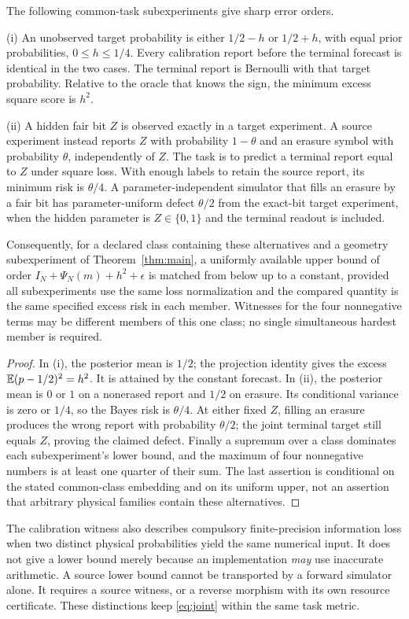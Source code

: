 \begin{proposition}\label{prop:floors}
The following common-task subexperiments give sharp error orders.

\textup{(i)} An unobserved target probability is either $1/2-h$ or $1/2+h$, with equal prior probabilities, $0\le h\le1/4$. Every calibration report before the terminal forecast is identical in the two cases. The terminal report is Bernoulli with that target probability. Relative to the oracle that knows the sign, the minimum excess square score is $h^2$.

\textup{(ii)} A hidden fair bit $Z$ is observed exactly in a target experiment. A source experiment instead reports $Z$ with probability $1-\theta$ and an erasure symbol with probability $\theta$, independently of $Z$. The task is to predict a terminal report equal to $Z$ under square loss. With enough labels to retain the source report, its minimum risk is $\theta/4$. A parameter-independent simulator that fills an erasure by a fair bit has parameter-uniform defect $\theta/2$ from the exact-bit target experiment, when the hidden parameter is $Z\in\{0,1\}$ and the terminal readout is included.

Consequently, for a declared class containing these alternatives and a geometry subexperiment of Theorem~\ref{thm:main}, a uniformly available upper bound of order $I_N+\Psi_N(m)+h^2+\epsilon$ is matched from below up to a constant, provided all subexperiments use the same loss normalization and the compared quantity is the same specified excess risk in each member. Witnesses for the four nonnegative terms may be different members of this one class; no single simultaneous hardest member is required.
\end{proposition}
\begin{proof}
In (i), the posterior mean is $1/2$; the projection identity gives the excess $\mathbb E(p-1/2)^2=h^2$. It is attained by the constant forecast. In (ii), the posterior mean is $0$ or $1$ on a nonerased report and $1/2$ on erasure. Its conditional variance is zero or $1/4$, so the Bayes risk is $\theta/4$. At either fixed $Z$, filling an erasure produces the wrong report with probability $\theta/2$; the joint terminal target still equals $Z$, proving the claimed defect. Finally a supremum over a class dominates each subexperiment's lower bound, and the maximum of four nonnegative numbers is at least one quarter of their sum. The last assertion is conditional on the stated common-class embedding and on its uniform upper, not an assertion that arbitrary physical families contain these alternatives.
\end{proof}

The calibration witness also describes compulsory finite-precision information loss when two distinct physical probabilities yield the same numerical input. It does not give a lower bound merely because an implementation \emph{may} use inaccurate arithmetic. A source lower bound cannot be transported by a forward simulator alone. It requires a source witness, or a reverse morphism with its own resource certificate. These distinctions keep \eqref{eq:joint} within the same task metric.
